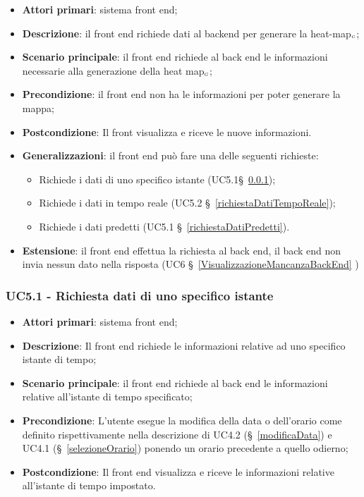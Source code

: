 \begin{itemize}
	\item \textbf{Attori primari}: sistema front end;
	\item \textbf{Descrizione}: il front end richiede dati al backend per generare la heat-map$_{\scaleto{G}{3pt}}$;
	\item \textbf{Scenario principale}: il front end richiede al back end le informazioni necessarie alla generazione della heat map$_{\scaleto{G}{3pt}}$;
	\item \textbf{Precondizione}: il front end non ha le informazioni per poter generare la mappa;
	\item \textbf{Postcondizione}: Il front visualizza e riceve le nuove informazioni. 
	\item \textbf{Generalizzazioni}: il front end può fare una delle seguenti richieste:
	\begin{itemize}
		\item Richiede i dati di uno specifico istante (UC5.1\S~\ref{richiestaDatiGiorno});
		\item Richiede i dati in tempo reale (UC5.2 \S~\ref{richiestaDatiTempoReale});
		\item Richiede i dati predetti (UC5.1 \S~\ref{richiestaDatiPredetti}).
	\end{itemize}
	\item \textbf{Estensione}: il front end effettua la richiesta al back end, il back end non invia nessun dato nella risposta (UC6 \S~\ref{VisualizzazioneMancanzaBackEnd} )
\end{itemize}

\subsubsection{UC5.1 - Richiesta dati di uno specifico istante}\label{richiestaDatiGiorno}
\begin{itemize}
	\item \textbf{Attori primari}: sistema front end;
	\item \textbf{Descrizione}: Il front end richiede le informazioni relative ad uno specifico istante di tempo;
	\item \textbf{Scenario principale}:  il front end richiede al back end le informazioni relative all'istante di tempo specificato;
	\item \textbf{Precondizione}: L’utente esegue la modifica della data o dell’orario come definito rispettivamente nella descrizione di UC4.2 (\S~\ref{modificaData}) e UC4.1 (\S~\ref{selezioneOrario}) ponendo un orario precedente a quello odierno;
	\item \textbf{Postcondizione}: Il front end visualizza e riceve le informazioni relative all'istante di tempo impostato. 
\end{itemize}


